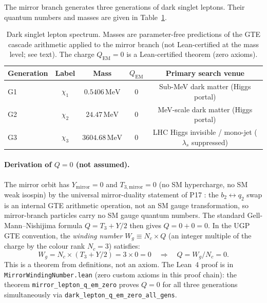 \documentclass[11pt]{article}
\begin{document}
The mirror branch generates three generations of dark singlet leptons. Their quantum
numbers and masses are given in Table~\ref{tab:dark_leptons}.

\begin{table}[H]
\centering
\caption{Dark singlet lepton spectrum. Masses are parameter-free predictions of the
GTE cascade arithmetic applied to the mirror branch (not Lean-certified at the mass
level; see text). The charge $Q_\mathrm{EM}=0$ is a Lean-certified theorem (zero axioms).}
\label{tab:dark_leptons}
\begin{tabular}{lcccc}
\toprule
Generation & Label & Mass & $Q_\mathrm{EM}$ & Primary search venue \\
\midrule
G1 & $\chi_1$ & $0.5406\,\mathrm{MeV}$ & $0$ & Sub-MeV dark matter (Higgs portal) \\
G2 & $\chi_2$ & $24.47\,\mathrm{MeV}$  & $0$ & MeV-scale dark matter (Higgs portal) \\
G3 & $\chi_3$ & $3604.68\,\mathrm{MeV}$ & $0$ & LHC Higgs invisible / mono-jet ($\lambda_s$ suppressed) \\
\bottomrule
\end{tabular}
\end{table}

\paragraph{Derivation of $Q=0$ (not assumed).}
The mirror orbit has $Y_\mathrm{mirror} = 0$ and $T_{3,\mathrm{mirror}} = 0$ (no SM
hypercharge, no SM weak isospin) by the universal mirror-duality statement of P17
\cite{SpivackBraidAtlas}: the $b_2\leftrightarrow q_2$ swap is an internal GTE arithmetic
operation, not an SM gauge transformation, so mirror-branch particles carry no SM gauge
quantum numbers. The standard Gell-Mann--Nishijima formula $Q = T_3 + Y/2$ then gives
$Q = 0 + 0 = 0$. In the UGP GTE convention, the \emph{winding number} $W_g \equiv N_c \times Q$
(an integer multiple of the charge by the colour rank $N_c=3$) satisfies:
\begin{equation}
W_g = N_c \times (T_3 + Y/2) = 3 \times 0 = 0
\quad\Longrightarrow\quad
Q = W_g / N_c = 0.
\label{eq:winding_q}
\end{equation}
This is a theorem from definitions, not an axiom. The Lean~4 proof is in
\texttt{MirrorWindingNumber.lean} (zero custom axioms in this proof chain): the theorem
\texttt{mirror\_lepton\_q\_em\_zero} proves $Q=0$ for all three generations simultaneously
via \texttt{dark\_lepton\_q\_em\_zero\_all\_gens}.
\end{document}
